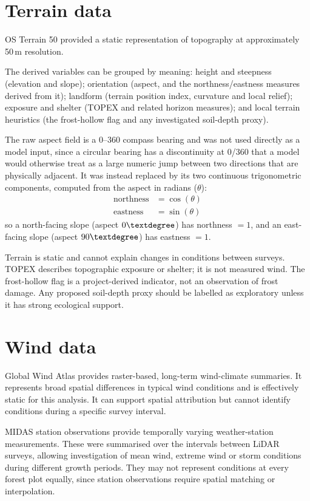 \section{Terrain data}
OS Terrain 50 provided a static representation of topography at approximately 50\,m resolution.

The derived variables can be grouped by meaning: height and steepness (elevation and slope); orientation (aspect, and the northness/eastness measures derived from it); landform (terrain position index, curvature and local relief); exposure and shelter (TOPEX and related horizon measures); and local terrain heuristics (the frost-hollow flag and any investigated soil-depth proxy).

The raw aspect field is a 0--360\textdegree{} compass bearing and was not used directly as a model input, since a circular bearing has a discontinuity at 0\textdegree{}/360\textdegree{} that a model would otherwise treat as a large numeric jump between two directions that are physically adjacent.
It was instead replaced by its two continuous trigonometric components, computed from the aspect in radians ($\theta$):
\begin{align*}
\text{northness} &= \cos(\theta) \\
\text{eastness} &= \sin(\theta)
\end{align*}
so a north-facing slope (aspect $0\textdegree$) has northness $=1$, and an east-facing slope (aspect $90\textdegree$) has eastness $=1$.

Terrain is static and cannot explain changes in conditions between surveys.
TOPEX describes topographic exposure or shelter; it is not measured wind.
The frost-hollow flag is a project-derived indicator, not an observation of frost damage.
Any proposed soil-depth proxy should be labelled as exploratory unless it has strong ecological support.

\section{Wind data}
Global Wind Atlas provides raster-based, long-term wind-climate summaries.
It represents broad spatial differences in typical wind conditions and is effectively static for this analysis.
It can support spatial attribution but cannot identify conditions during a specific survey interval.

MIDAS station observations provide temporally varying weather-station measurements.
These were summarised over the intervals between LiDAR surveys, allowing investigation of mean wind, extreme wind or storm conditions during different growth periods.
They may not represent conditions at every forest plot equally, since station observations require spatial matching or interpolation.

